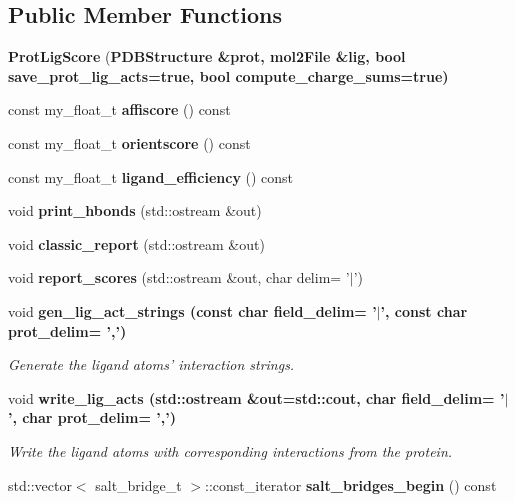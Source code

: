 \subsection*{Public Member Functions}
\begin{CompactItemize}
\item 
\textbf{Prot\-Lig\-Score} (\bf{PDBStructure} \&prot, \bf{mol2File} \&lig, bool save\_\-prot\_\-lig\_\-acts=true, bool compute\_\-charge\_\-sums=true)\label{classASCbase_1_1ProtLigScore_1770dc58245d85131f7040e5acffdeff}

\item 
const my\_\-float\_\-t \textbf{affiscore} () const \label{classASCbase_1_1ProtLigScore_3b141a7e5ba3c877356e268809133520}

\item 
const my\_\-float\_\-t \textbf{orientscore} () const \label{classASCbase_1_1ProtLigScore_5d08bfc7c970cb20a8418452c70f676e}

\item 
const my\_\-float\_\-t \textbf{ligand\_\-efficiency} () const \label{classASCbase_1_1ProtLigScore_1f92dc0a2b0830b392f6f5648e6e316b}

\item 
void \textbf{print\_\-hbonds} (std::ostream \&out)\label{classASCbase_1_1ProtLigScore_2632d23a6e61c4c16781bf8fe9323fda}

\item 
void \textbf{classic\_\-report} (std::ostream \&out)\label{classASCbase_1_1ProtLigScore_60120a05bc1c6cd704174e08e3110ba1}

\item 
void \textbf{report\_\-scores} (std::ostream \&out, char delim= '$|$')\label{classASCbase_1_1ProtLigScore_908635d9e01981a9e813df7947505f3d}

\item 
void \bf{gen\_\-lig\_\-act\_\-strings} (const char field\_\-delim= '$|$', const char prot\_\-delim= ',')
\begin{CompactList}\small\item\em Generate the ligand atoms' interaction strings. \item\end{CompactList}\item 
void \bf{write\_\-lig\_\-acts} (std::ostream \&out=std::cout, char field\_\-delim= '$|$', char prot\_\-delim= ',')\label{classASCbase_1_1ProtLigScore_1433bfcfed24d1a064ad4ead1f5e6a47}

\begin{CompactList}\small\item\em Write the ligand atoms with corresponding interactions from the protein. \item\end{CompactList}\item 
std::vector$<$ salt\_\-bridge\_\-t $>$::const\_\-iterator \textbf{salt\_\-bridges\_\-begin} () const \label{classASCbase_1_1ProtLigScore_91e6b0e118597d22d6a7cd4deecc45da}


\end{CompactItemize}
